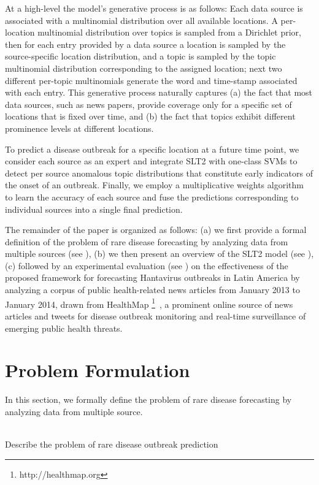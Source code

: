 \documentclass{sig-alternate}
\newcommand{\model}{{SLT2}\xspace} %
\begin{document}
At a high-level the model's generative process is as follows: Each data source is associated with a multinomial distribution over all available locations. A per-location multinomial distribution over topics is sampled from a Dirichlet prior, then for each entry provided by a data source a location is sampled by the source-specific location distribution, and a topic is sampled by the topic multinomial distribution corresponding to the assigned location; next two different per-topic multinomials generate the word and time-stamp associated with each entry. This generative process naturally captures (a) the fact that most data sources, such as news papers, provide coverage only for a specific set of locations that is fixed over time, and (b) the fact that topics exhibit different prominence levels at different locations.

To predict a disease outbreak for a specific location at a future time point, we consider each source as an expert and integrate \model with one-class SVMs to detect per source anomalous topic distributions that constitute early indicators of the onset of an outbreak. Finally, we employ a multiplicative weights algorithm to learn the accuracy of each source and fuse the predictions corresponding to individual sources into a single final prediction.

The remainder of the paper is organized as follows: (a) we first provide a formal definition of the problem of rare disease forecasting by analyzing data from multiple sources (see ), (b) we then present an overview of the \model model (see ), (c) followed by an experimental evaluation (see ) on the effectiveness of the proposed framework for forecasting Hantavirus outbreaks in Latin America by analyzing a corpus of public health-related news articles from January 2013 to January 2014, drawn from HealthMap \footnote{http://healthmap.org}~\cite{healthmap}, a prominent online source of news articles and tweets for disease outbreak monitoring and real-time surveillance of emerging public health threats.

\section{Problem Formulation}
\label{sec:problem}

In this section, we formally define the problem of rare disease forecasting by analyzing data from multiple source.

\ \\Describe the problem of rare disease outbreak prediction
\end{document}
